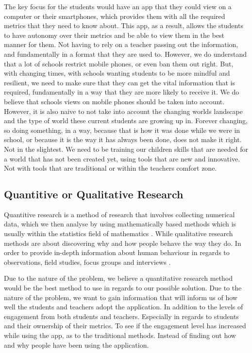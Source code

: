 \documentclass{sigchi}
\begin{document}
The key focus for the students would have an app that they could view on a computer or their smartphones, which provides them with all the required metrics that they need to know about. This app, as a result, allows the students to have autonomy over their metrics and be able to view them in the best manner for them. Not having to rely on a teacher passing out the information, and fundamentally in a format that they are used to. However, we do understand that a lot of schools restrict mobile phones, or even ban them out right. But, with changing times, with schools wanting students to be more mindful and resilient, we need to make sure that they can get the vital information that is required, fundamentally in a way that they are more likely to receive it. We do believe that schools views on mobile phones should be taken into account. However, it is also naive to not take into account the changing worlds landscape and the type of world these current students are growing up in. Forever changing, so doing something, in a way, because that is how it was done while we were in school, or because it is the way it has always been done, does not make it right. Not in the slightest. We need to be training our children skills that are needed for a world that has not been created yet, using tools that are new and innovative. Not with tools that are traditional or within the teachers comfort zone.

\subsection{Quantitive  or Qualitative Research}
Quantitive research is a method of research that involves collecting numerical data, which we then analyse by using mathematically based methods which is usually within the statistics field of mathematics \cite{Suiyan slides}. While qualitative research methods are about discovering why and how people behave the way they do. In order to provide in-depth information about human behaviour in regards to observations, field studies, focus groups and interviews \cite{Suiyan slides}. 

Due to the nature of the problem, we believe a quantitative research method would be the best method to use in regards to our possible solution. Due to the nature of the problem, we want to gain information that will inform us of how well the students and teachers adopt the application. In addition to the levels of engagement from both students and teachers. Especially in regards to students and their ownership of their metrics. To see if the engagement level has increased while using the app, as to the traditional methods. Instead of finding out how and why people have been using the application.
\end{document}
